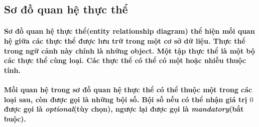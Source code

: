 \documentclass{article}
\begin{document}
  \subsection{Sơ đồ quan hệ thực thể}

  \paragraph{\textnormal{
    Sơ đồ quan hệ thực thể(entity relationship diagram) thể hiện mối quan hệ giữa các thực thể được lưu trữ trong một cơ sở dữ liệu. Thực thể trong ngữ cảnh này chính là những object. Một tập thực thể là một bộ các thực thể cùng loại. Các thực thể có thể có một hoặc nhiều thuộc tính.
  }}

  \paragraph{\textnormal{
    Mối quan hệ trong sơ đồ quan hệ thực thể có thể thuộc một trong các loại sau, còn được gọi là những bội số. Bội số nếu có thể nhận giá trị $0$ được gọi là \textit{optional}(tùy chọn), ngược lại được gọi là \textit{mandatory}(bắt buộc).
  }}
\end{document}
